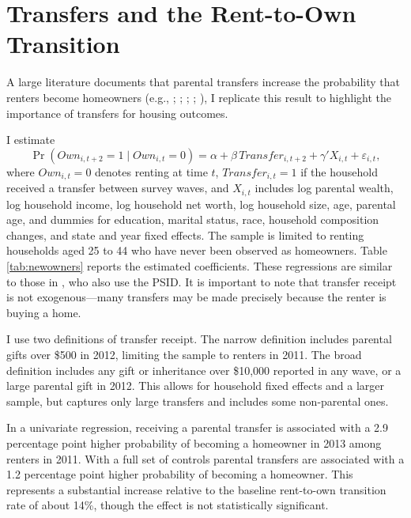 \documentclass[12pt]{article}
\begin{document}
\section{Transfers and the Rent-to-Own Transition}\label{app:rent_to_own}
A large literature documents that parental transfers increase the probability that renters become homeowners (e.g., \citealp{wold2024housing}; \citealp{Blickle2019}; \citealp{benetton2022dynastic}; \citealp{Guiso2002}; \citealp{Engelhardt1998}), I replicate this result to highlight the importance of transfers for housing outcomes. 

I estimate
\begin{equation}	\label{eq:transferrent}
	\Pr\left(Own_{i,t+2}=1 \mid Own_{i,t}=0\right)
	= \alpha + \beta\,Transfer_{i,t+2}
	  + \gamma' X_{i,t} + \varepsilon_{i,t},
\end{equation}
where \(Own_{i,t}=0\) denotes renting at time \(t\), \(Transfer_{i,t}=1\) if the household received a transfer between survey waves, and \(X_{i,t}\) includes log parental wealth, log household income, log household net worth, log household size, age, parental age, and dummies for  education, marital status, race, household composition changes, and state and year fixed effects. The sample is limited to renting households aged 25 to 44 who have never been observed as homeowners. Table \ref{tab:newowners} reports the estimated coefficients. These regressions are similar to those in \cite{Lee2018}, who also use the PSID.  It is important to note that transfer receipt is not exogenous---many transfers may be made precisely because the renter is buying a home.

I use two definitions of transfer receipt. The narrow definition includes parental gifts over \$500 in 2012, limiting the sample to renters in 2011. The broad definition includes any gift or inheritance over \$10,000 reported in any wave, or a large parental gift in 2012. This allows for household fixed effects and a larger sample, but captures only large transfers and includes some non-parental ones.

In a univariate regression, receiving a parental transfer is associated with a 2.9 percentage point higher probability of becoming a homeowner in 2013 among renters in 2011. With a full set of controls parental transfers are associated with a 1.2 percentage point higher probability of becoming a homeowner. This represents a substantial increase relative to the baseline rent-to-own transition rate of about 14\%, though the effect is not statistically significant. 
\end{document}
